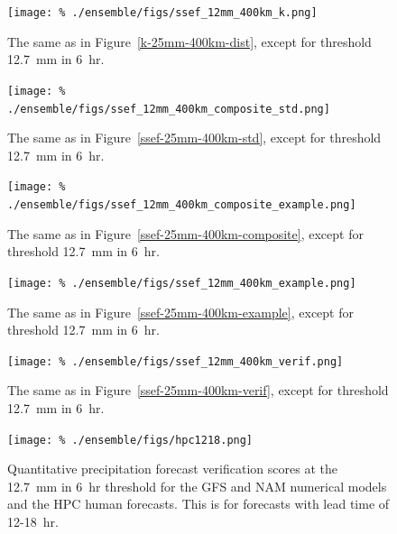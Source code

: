 \clearpage
\begin{figure}[cc]
    \centering
    \texttt{[image: \%
    ./ensemble/figs/ssef\_12mm\_400km\_k.png]}\\
    \caption{The same as in \mbox{Figure \ref{k-25mm-400km-dist}}, except for threshold \mbox{12.7 mm} in \mbox{6 hr}.}
    \label{k-12mm-400km-dist}
\end{figure}


\clearpage
\begin{figure}[cc]
    \centering
    \texttt{[image: \%
    ./ensemble/figs/ssef\_12mm\_400km\_composite\_std.png]}\\
    \caption{The same as in \mbox{Figure \ref{ssef-25mm-400km-std}}, except for threshold \mbox{12.7 mm} in \mbox{6 hr}.}
    \label{ssef-12mm-400km-std}
\end{figure}


\clearpage
\begin{figure}[cc]
    \centering
    \texttt{[image: \%
    ./ensemble/figs/ssef\_12mm\_400km\_composite\_example.png]}\\
    \caption{The same as in \mbox{Figure \ref{ssef-25mm-400km-composite}}, except for threshold \mbox{12.7 mm} in \mbox{6 hr}.}
    \label{ssef-12mm-400km-composite}
\end{figure}


\clearpage
\begin{figure}[cc]
    \centering
    \texttt{[image: \%
    ./ensemble/figs/ssef\_12mm\_400km\_example.png]}\\
    \caption{The same as in \mbox{Figure \ref{ssef-25mm-400km-example}}, except for threshold \mbox{12.7 mm} in \mbox{6 hr}.}
    \label{ssef-12mm-400km-example}
\end{figure}


\clearpage
\begin{figure}[cc]
    \centering
    \texttt{[image: \%
    ./ensemble/figs/ssef\_12mm\_400km\_verif.png]}\\
    \caption{The same as in \mbox{Figure \ref{ssef-25mm-400km-verif}}, except for threshold \mbox{12.7 mm} in \mbox{6 hr}.}
    \label{ssef-12mm-400km-verif}
\end{figure}




\clearpage
\begin{figure}[cc]
    \centering
    \texttt{[image: \%
    ./ensemble/figs/hpc1218.png]}\\
    \caption{Quantitative precipitation forecast verification scores at the \mbox{12.7 mm} in \mbox{6 hr} threshold for the GFS and NAM numerical models and the HPC human forecasts.
    This is for forecasts with lead time of \mbox{12-18 hr}.}
    \label{hpc18}
\end{figure}


